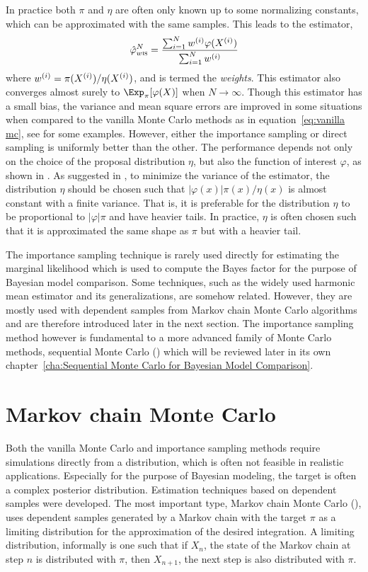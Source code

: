 In practice both $\pi$ and $\eta$ are often only known up to some normalizing
constants, which can be approximated with the same samples. This leads to the
estimator,
\begin{equation}
  \hat\varphi_{w\text{\textsc{is}}}^N
  = \frac{\sum_{i=1}^Nw^{(i)}\varphi(X^{(i)})}{\sum_{i=1}^Nw^{(i)}}
\end{equation}
where $w^{(i)} = \pi(X^{(i)})/\eta(X^{(i)})$, and is termed the \emph{weights}. This
estimator also converges almost surely to $\Exp_{\pi}[\varphi(X)]$ when
$N\to\infty$. Though this estimator has a small bias, the variance and mean
square errors are improved in some situations when compared to the vanilla
Monte Carlo methods as in equation~\eqref{eq:vanilla mc}, see
\cite{Casella:1998tj} for some examples. However, either the importance
sampling or direct sampling is uniformly better than the other. The
performance depends not only on the choice of the proposal distribution
$\eta$, but also the function of interest $\varphi$, as shown in
\cite{Casella:1998tj}. As suggested in \cite[][sec.~3.3.2]{Robert:2004tn}, to
minimize the variance of the estimator, the distribution $\eta$ should be
chosen such that $|\varphi(x)|\pi(x)/\eta(x)$ is almost constant with a finite
variance. That is, it is preferable for the distribution $\eta$ to be
proportional to $|\varphi|\pi$ and have heavier tails. In practice, $\eta$ is
often chosen such that it is approximated the same shape as $\pi$ but with a
heavier tail.

The importance sampling technique is rarely used directly for estimating the
marginal likelihood which is used to compute the Bayes factor for the purpose
of Bayesian model comparison. Some techniques, such as the widely used
harmonic mean estimator and its generalizations, are somehow related. However,
they are mostly used with dependent samples from Markov chain Monte Carlo
algorithms and are therefore introduced later in the next section. The
importance sampling method however is fundamental to a more advanced family of
Monte Carlo methods, sequential Monte Carlo (\smc) which will be reviewed
later in its own chapter~\ref{cha:Sequential Monte Carlo for Bayesian Model
  Comparison}.

\section{Markov chain Monte Carlo}
\label{sec:Markov chain Monte Carlo}

Both the vanilla Monte Carlo and importance sampling methods require
simulations directly from a distribution, which is often not feasible in
realistic applications. Especially for the purpose of Bayesian modeling, the
target is often a complex posterior distribution. Estimation techniques based
on dependent samples were developed. The most important type, Markov chain
Monte Carlo (\mcmc), uses dependent samples generated by a Markov chain with
the target $\pi$ as a limiting distribution for the approximation of the
desired integration. A limiting distribution, informally is one such that if
$X_n$, the state of the Markov chain at step $n$ is distributed with $\pi$,
then $X_{n+1}$, the next step is also distributed with $\pi$.

